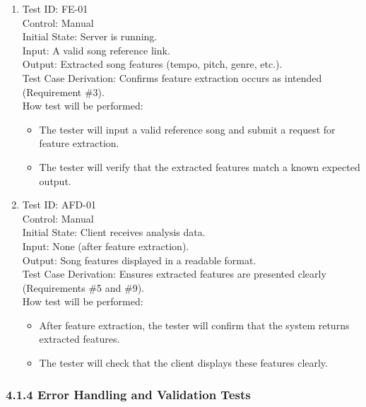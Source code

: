 \documentclass[12pt, titlepage]{article}
\begin{document}
\begin{enumerate}

\item Test ID: FE-01\\
Control: Manual\\
Initial State: Server is running.\\
Input: A valid song reference link.\\
Output: Extracted song features (tempo, pitch, genre, etc.).\\
Test Case Derivation: Confirms feature extraction occurs as intended (Requirement \#3).\\
How test will be performed:
\begin{itemize}
    \item The tester will input a valid reference song and submit a request for feature extraction.
    \item The tester will verify that the extracted features match a known expected output.
\end{itemize}

\item Test ID: AFD-01\\
Control: Manual\\
Initial State: Client receives analysis data.\\
Input: None (after feature extraction).\\
Output: Song features displayed in a readable format.\\
Test Case Derivation: Ensures extracted features are presented clearly (Requirements \#5 and \#9).\\
How test will be performed:
\begin{itemize}
    \item After feature extraction, the tester will confirm that the system returns extracted features.
    \item The tester will check that the client displays these features clearly.
\end{itemize}

\end{enumerate}

\subsubsection{4.1.4 Error Handling and Validation Tests}
\end{document}

